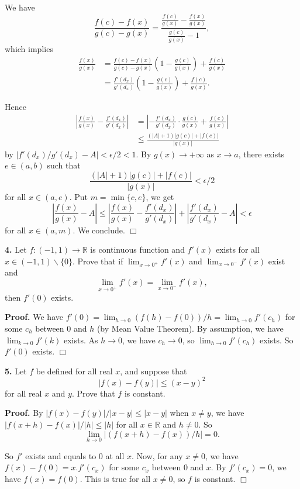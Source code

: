 \documentclass{article}
\begin{document}
We have
\[\frac{f(c) - f(x)}{g(c) - g(x)} = \frac{\frac{f(c)}{g(x)} - \frac{f(x)}{g(x)}}{\frac{g(c)}{g(x)} - 1},\]
which implies \[\begin{aligned}
\frac{f(x)}{g(x)} &= \frac{f(c) - f(x)}{g(c) - g(x)}\left(1 - \frac{g(c)}{g(x) }\right) + \frac{f(c)}{g(x)}\\
&=\frac{f'(d_x)}{g'(d_x)}\left(1 - \frac{g(c)}{g(x) }\right) + \frac{f(c)}{g(x)} .
\end{aligned}\]

Hence \[\begin{aligned}
\left|\frac{f(x)}{g(x)} - \frac{f'(d_x)}{g'(d_x)}\right|&= \left|-\frac{f'(d_x)}{g'(d_x)}\cdot \frac{g(c)}{g(x)} + \frac{f(c)}{g(x)}\right|\\
&\le \frac{ (|A| + 1)|g(c)|+ |f(c)|}{|g(x)|}
\end{aligned}\] by $|f'(d_x)/g'(d_x) - A| < \epsilon/2 < 1$. By
$g(x) \to +\infty$ as $x \to a$, there exists $e \in (a,b)$ such that
\[ \frac{ (|A| + 1)|g(c)|+ |f(c)|}{|g(x)|} < \epsilon /2\] for all
$x \in (a,e)$. Put $m = \min \{c,e\}$, we get
\[\left|\frac{f(x)}{g(x)} - A\right| \le \left|\frac{f(x)}{g(x)} - \frac{f'(d_x)}{g'(d_x)}\right| + \left| \frac{f'(d_x)}{g'(d_x)} - A\right| < \epsilon\]
for all $x\in (a,m)$. We conclude. $\Box$

    \textbf{4.} Let $f:(-1,1)\to \mathbb{R}$ is continuous function and
$f'(x)$ exists for all $x\in (-1,1)\backslash \{0\}$. Prove that if
$\lim_{x\to 0^+} f'(x)$ and $\lim_{x\to 0^-} f'(x)$ exist and
\[\lim_{x\to 0^+} f'(x) = \lim_{x\to 0^-} f'(x),\] then $f'(0)$ exists.

    \textbf{Proof.} We have
$f'(0) = \lim_{h\to 0}(f(h)-f(0))/h = \lim_{h\to 0} f'(c_h)$ for some
$c_h$ between $0$ and $h$ (by Mean Value Theorem). By assumption, we
have $\lim_{k\to 0} f'(k)$ exists. As $h \to 0$, we have $c_h \to 0$, so
$\lim_{h\to 0} f'(c_h)$ exists. So $f'(0)$ exists. $\Box$

    \textbf{5.} Let $f$ be defined for all real $x$, and suppose that
\[|f(x) - f(y)| \le (x-y)^2\] for all real $x$ and $y$. Prove that $f$
is constant.

    \textbf{Proof.} By $|f(x) - f(y)| / |x-y| \le |x-y|$ when $x\ne y$, we
have $|f(x+h) - f(x)|/|h| \le |h|$ for all $x\in \mathbb{R}$ and
$h \ne 0$. So \[\lim_{h\to 0}| (f(x+h) - f(x) )/ h| = 0.\]

So $f'$ exists and equals to $0$ at all $x$. Now, for any $x \ne 0$, we
have $f(x) - f(0) = x.f'(c_x)$ for some $c_x$ between $0$ and $x$. By
$f'(c_x)= 0$, we have $f(x) = f(0)$. This is true for all $x \ne 0$, so
$f$ is constant. $\Box$
\end{document}
